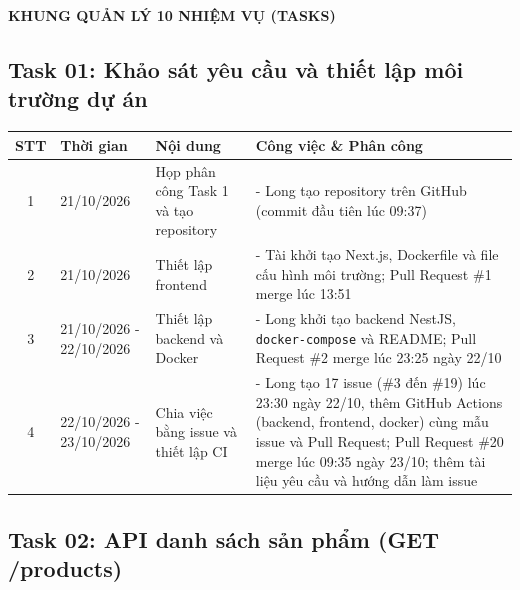\documentclass[12pt, a4paper]{article}
\renewcommand{\arraystretch}{2.2}
\begin{document}
\begin{center}
    \Large\textbf{KHUNG QUẢN LÝ 10 NHIỆM VỤ (TASKS)}
\end{center}

\vspace{0.5cm}

\renewcommand{\arraystretch}{1.4} %
\subsection*{Task 01: Khảo sát yêu cầu và thiết lập môi trường dự án}

\begin{tabularx}{\textwidth}{|c|p{3.2cm}|Y|Y|}
    \hline
    \textbf{STT} & \textbf{Thời gian} & \textbf{Nội dung} & \textbf{Công việc \& Phân công} \\
    \hline

    1 & 21/10/2026 & Họp phân công Task 1 và tạo repository &
    - Long tạo repository trên GitHub (commit đầu tiên lúc 09:37) \\
    \hline

    2 & 21/10/2026 & Thiết lập frontend &
    - Tài khởi tạo Next.js, Dockerfile và file cấu hình môi trường; Pull Request \#1 merge lúc 13:51 \\
    \hline

    3 & 21/10/2026 - 22/10/2026 & Thiết lập backend và Docker &
    - Long khởi tạo backend NestJS, \texttt{docker-compose} và README; Pull Request \#2 merge lúc 23:25 ngày 22/10 \\
    \hline

    4 & 22/10/2026 - 23/10/2026 & Chia việc bằng issue và thiết lập CI &
    - Long tạo 17 issue (\#3 đến \#19) lúc 23:30 ngày 22/10, thêm GitHub Actions (backend, frontend, docker) cùng mẫu issue và Pull Request; Pull Request \#20 merge lúc 09:35 ngày 23/10; thêm tài liệu yêu cầu và hướng dẫn làm issue \\
    \hline
\end{tabularx}

\vspace{0.8cm}

\subsection*{Task 02: API danh sách sản phẩm (GET /products)}
\end{document}
